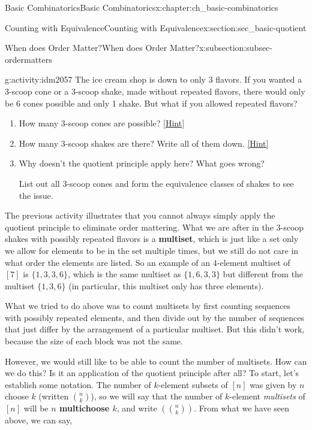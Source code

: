 \documentclass[oneside,10pt,]{book}
\newcommand{\terminology}[1]{\textbf{#1}}
\numberwithin{equation}{chapter}
\newcommand{\mchoose}[2]{\left(\!\binom{#1}{#2}\!\right)}
\begin{document}
\begin{chapterptx}{Basic Combinatorics}{}{Basic Combinatorics}{}{}{x:chapter:ch_basic-combinatorics}
\begin{sectionptx}{Counting with Equivalence}{}{Counting with Equivalence}{}{}{x:section:sec_basic-quotient}
\begin{subsectionptx}{When does Order Matter?}{}{When does Order Matter?}{}{}{x:subsection:subsec-ordermatters}
\begin{activity}{}{g:activity:idm2057}%
The ice cream shop is down to only 3 flavors.  If you wanted a 3-scoop cone or a 3-scoop shake, made without repeated flavors, there would only be 6 cones possible and only 1 shake.  But what if you allowed repeated flavors?%
\begin{enumerate}[font=\bfseries,label=(\alph*),ref=\alph*]
\item{}How many 3-scoop cones are possible?%
\space\hspace*{0pt}\hfill{\tiny\hyperlink{g:hint:idm2063-back}{[Hint]}}\item{}How many 3-scoop shakes are there?  Write all of them down.%
\space\hspace*{0pt}\hfill{\tiny\hyperlink{g:hint:idm2068-back}{[Hint]}}\item{}Why doesn't the quotient principle apply here?  What goes wrong?%
\par
List out all 3-scoop cones and form the equivalence classes of shakes to see the issue.%
\end{enumerate}
\end{activity}
The previous activity illustrates that you cannot always simply apply the quotient principle to eliminate order mattering.  What we are after in the 3-scoop shakes with possibly repeated flavors is a \terminology{multiset}, which is just like a set only we allow for elements to be in the set multiple times, but we still do not care in what order the elements are listed.  So an example of an \(4\)-element multiset of \([7]\) is \(\{1,3,3,6\}\), which is the same multiset as \(\{1,6,3,3\}\) but different from the multiset \(\{1,3,6\}\) (in particular, this multiset only has three elements).%
\par
What we tried to do above was to count multisets by first counting sequences with possibly repeated elements, and then divide out by the number of sequences that just differ by the arrangement of a particular multiset.  But this didn't work, because the size of each block was not the same.%
\par
However, we would still like to be able to count the number of multisets.  How can we do this?  Is it an application of the quotient principle after all?  To start, let's establish some notation.  The number of \(k\)-element subsets of \([n]\) was given by \(n\) choose \(k\) (written \(\binom{n}{k}\)), so we will say that the number of \(k\)-element \emph{multisets} of \([n]\) will be \terminology{\(n\) multichoose \(k\)}, and write \(\mchoose{n}{k}\).  From what we have seen above, we can say,%

\end{subsectionptx}
\end{sectionptx}
\end{chapterptx}
\end{document}
